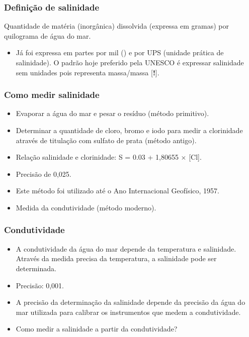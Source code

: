 \begin{frame}
\frametitle{Definição de salinidade}
    \small{
    \begin{block}{}
    Quantidade de matéria (inorgânica) dissolvida (expressa em gramas) por
    quilograma de água do mar.
    \end{block}
    }
    \pause
    \small{
    \begin{itemize}[<+-| alert@+>]
    \item Já foi expressa em partes por mil (\textperthousand) e por UPS
    (unidade prática de salinidade).  O padrão hoje preferido pela UNESCO é
    expressar salinidade sem unidades pois representa massa/massa [{\bf !}].
    \end{itemize}
    }
\end{frame}

\begin{frame}
\frametitle{Como medir salinidade}
    \small{
    \begin{itemize}[<+-| alert@+>]
    \item Evaporar a água do mar e pesar o resíduo (método primitivo).
    \item Determinar a quantidade de cloro, bromo e iodo para medir a
          clorinidade através de titulação com sulfato de prata (método
          antigo).
    \item Relação salinidade e clorinidade: S = 0.03 + 1,80655 $\times$ [Cl].
    \item Precisão de 0,025.
    \item Este método foi utilizado até o Ano Internacional Geofísico, 1957.
    \item Medida da condutividade (método moderno).
    \end{itemize}
    }
\end{frame}

\begin{frame}
\frametitle{Condutividade}
    \small{
    \begin{itemize}[<+-| alert@+>]
    \item A condutividade da água do mar depende da temperatura e salinidade.
          Através da medida precisa da temperatura, a salinidade pode ser
          determinada.
    \item Precisão: 0,001.
    \item A precisão da determinação da salinidade depende da precisão da água
          do mar utilizada para calibrar os instrumentos que medem a condutividade.
    \item Como medir a salinidade a partir da condutividade?
    \end{itemize}
    }
\end{frame}

